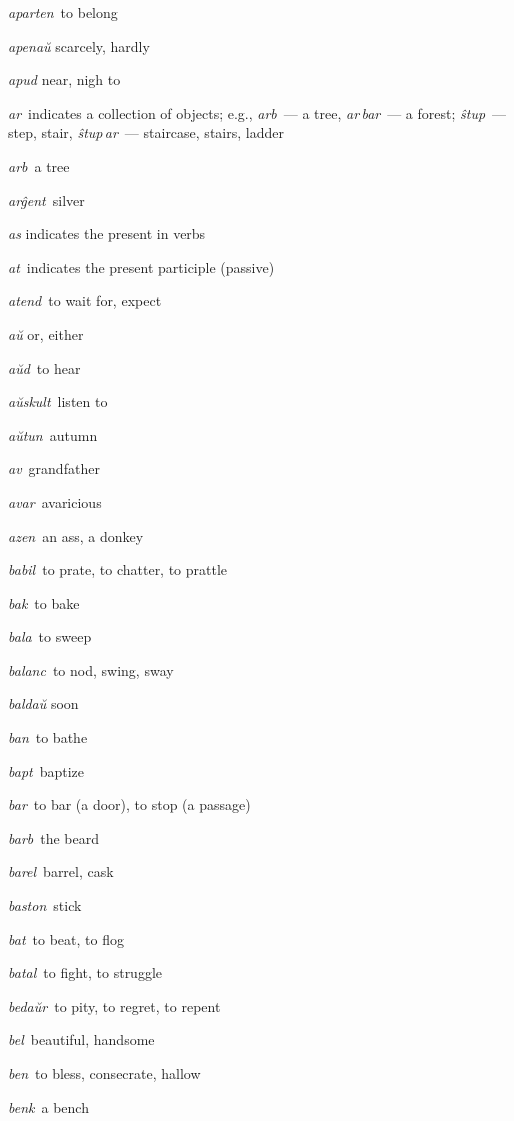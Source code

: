 \begin{landscape}
\begin{multicols}{5}
\begin{outdent}{1em}
\emph{aparten\,} to belong

\emph{apenaŭ} scarcely, hardly

\emph{apud} near, nigh to

\emph{ar\,} indicates a collection of objects; e.g., \emph{arb\,} — a tree, \emph{ar\,bar\,} — a forest; \emph{ŝtup\,} — step, stair, \emph{ŝtup\,ar\,} — staircase, stairs, ladder

\emph{arb\,} a tree

\emph{arĝent\,} silver

\emph{as} indicates the present in verbs

\emph{at\,} indicates the present participle (passive)

\emph{atend\,} to wait for, expect

\emph{aŭ} or, either

\emph{aŭd\,} to hear

\emph{aŭskult\,} listen to

\emph{aŭtun\,} autumn

\emph{av\,} grandfather

\emph{avar\,} avaricious

\emph{azen\,} an ass, a donkey
\end{outdent}


\begin{outdent}{1em}
\emph{babil\,} to prate, to chatter, to prattle

\emph{bak\,} to bake

\emph{bala\,} to sweep

\emph{balanc\,} to nod, swing, sway

\emph{baldaŭ} soon

\emph{ban\,} to bathe

\emph{bapt\,} baptize

\emph{bar\,} to bar (a door), to stop (a passage)

\emph{barb\,} the beard

\emph{barel\,} barrel, cask

\emph{baston\,} stick

\emph{bat\,} to beat, to flog

\emph{batal\,} to fight, to struggle

\emph{bedaŭr\,} to pity, to regret, to repent

\emph{bel\,} beautiful, handsome

\emph{ben\,} to bless, consecrate, hallow

\emph{benk\,} a bench


\end{outdent}
\end{multicols}
\end{landscape}
